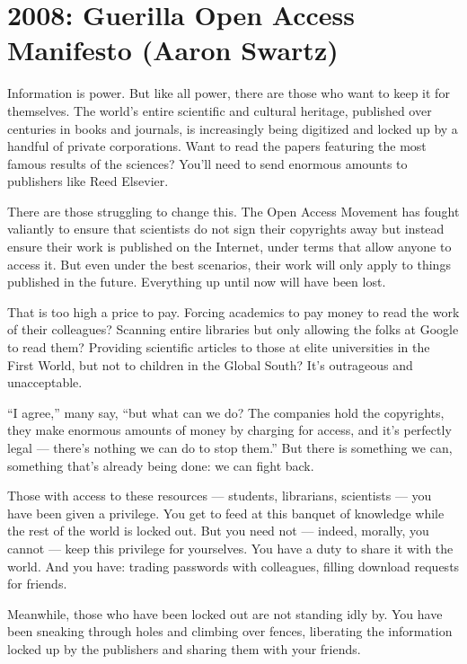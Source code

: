 \documentclass[letterpaper,12pt,english]{sphinxmanual}
\begin{document}

\chapter{2008: Guerilla Open Access Manifesto  (Aaron Swartz)}
\label{2008::doc}\label{2008:index-0}\label{2008:guerilla-open-access-manifesto-aaron-swartz}
Information is power. But like all power, there are those who want to keep it for themselves. The world's entire scientific and cultural heritage, published over centuries in books and journals, is increasingly being digitized and locked up by a handful of private corporations. Want to read the papers featuring the most famous results of the sciences? You'll need to send enormous amounts to publishers like Reed Elsevier.

There are those struggling to change this. The Open Access Movement has fought valiantly to ensure that scientists do not sign their copyrights away but instead ensure their work is published on the Internet, under terms that allow anyone to access it. But even under the best scenarios, their work will only apply to things published in the future. Everything up until now will have been lost.

That is too high a price to pay. Forcing academics to pay money to read the work of their colleagues? Scanning entire libraries but only allowing the folks at Google to read them? Providing scientific articles to those at elite universities in the First World, but not to children in the Global South? It's outrageous and unacceptable.

``I agree,'' many say, ``but what can we do? The companies hold the copyrights, they make enormous amounts of money by charging for access, and it's perfectly legal — there's nothing we can do to stop them.'' But there is something we can, something that's already being done: we can fight back.

Those with access to these resources — students, librarians, scientists — you have been given a privilege. You get to feed at this banquet of knowledge while the rest of the world is locked out. But you need not — indeed, morally, you cannot — keep this privilege for yourselves. You have a duty to share it with the world. And you have: trading passwords with colleagues, filling download requests for friends.

Meanwhile, those who have been locked out are not standing idly by. You have been sneaking through holes and climbing over fences, liberating the information locked up by the publishers and sharing them with your friends.
\end{document}
